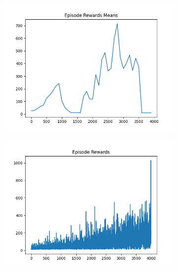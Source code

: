 \begin{figure}[H]
\begin{subfigure}{.47\linewidth}
        \includegraphics[width=\textwidth]{pole/2024-06-14_13-15-56_dqn_cartpole_episode_rewards_means.png}
    \end{subfigure}
    \begin{subfigure}{.47\linewidth}
        \centering
        \includegraphics[width=\textwidth]{pole/2024-06-14_15-38-10_dqn_cartpole_episode_rewards.png}
    \end{subfigure}
\end{figure}
